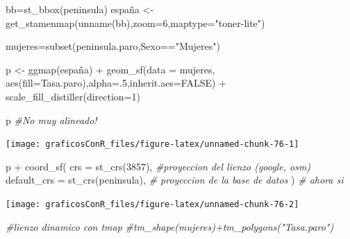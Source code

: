\documentclass[
]{article}
\newenvironment{Shaded}{\begin{snugshade}}{\end{snugshade}}
\newcommand{\AttributeTok}[1]{\textcolor[rgb]{0.77,0.63,0.00}{#1}}
\newcommand{\CommentTok}[1]{\textcolor[rgb]{0.56,0.35,0.01}{\textit{#1}}}
\newcommand{\ConstantTok}[1]{\textcolor[rgb]{0.00,0.00,0.00}{#1}}
\newcommand{\DecValTok}[1]{\textcolor[rgb]{0.00,0.00,0.81}{#1}}
\newcommand{\FunctionTok}[1]{\textcolor[rgb]{0.00,0.00,0.00}{#1}}
\newcommand{\NormalTok}[1]{#1}
\newcommand{\OtherTok}[1]{\textcolor[rgb]{0.56,0.35,0.01}{#1}}
\newcommand{\SpecialCharTok}[1]{\textcolor[rgb]{0.00,0.00,0.00}{#1}}
\newcommand{\StringTok}[1]{\textcolor[rgb]{0.31,0.60,0.02}{#1}}
\numberwithin{ejcnt}{section}
\begin{document}
\begin{Shaded}
\begin{Highlighting}[]
\NormalTok{bb}\OtherTok{=}\FunctionTok{st\_bbox}\NormalTok{(peninsula)}
\NormalTok{españa }\OtherTok{\textless{}{-}} \FunctionTok{get\_stamenmap}\NormalTok{(}\FunctionTok{unname}\NormalTok{(bb),}\AttributeTok{zoom=}\DecValTok{6}\NormalTok{,}\AttributeTok{maptype=}\StringTok{"toner{-}lite"}\NormalTok{)}

\NormalTok{mujeres}\OtherTok{=}\FunctionTok{subset}\NormalTok{(peninsula.paro,Sexo}\SpecialCharTok{==}\StringTok{"Mujeres"}\NormalTok{)}

\NormalTok{p }\OtherTok{\textless{}{-}} \FunctionTok{ggmap}\NormalTok{(españa) }\SpecialCharTok{+} 
      \FunctionTok{geom\_sf}\NormalTok{(}\AttributeTok{data =}\NormalTok{ mujeres, }\FunctionTok{aes}\NormalTok{(}\AttributeTok{fill=}\NormalTok{Tasa.paro),}\AttributeTok{alpha=}\NormalTok{.}\DecValTok{5}\NormalTok{,}\AttributeTok{inherit.aes=}\ConstantTok{FALSE}\NormalTok{) }\SpecialCharTok{+}
      \FunctionTok{scale\_fill\_distiller}\NormalTok{(}\AttributeTok{direction=}\DecValTok{1}\NormalTok{)  }

\NormalTok{p }\CommentTok{\#No muy alineado!}
\end{Highlighting}
\end{Shaded}

\begin{center}\texttt{[image: graficosConR\_files/figure-latex/unnamed-chunk-76-1]} \end{center}

\begin{Shaded}
\begin{Highlighting}[]
\NormalTok{p }\SpecialCharTok{+}   \FunctionTok{coord\_sf}\NormalTok{(}
      \AttributeTok{crs =} \FunctionTok{st\_crs}\NormalTok{(}\DecValTok{3857}\NormalTok{), }\CommentTok{\#proyeccion del lienzo (google, osm)}
    \AttributeTok{default\_crs =} \FunctionTok{st\_crs}\NormalTok{(peninsula),  }\CommentTok{\# proyeccion de la base de datos}
\NormalTok{  ) }\CommentTok{\# ahora si}
\end{Highlighting}
\end{Shaded}

\begin{center}\texttt{[image: graficosConR\_files/figure-latex/unnamed-chunk-76-2]} \end{center}

\begin{Shaded}
\begin{Highlighting}[]
\CommentTok{\#lienzo dinamico con tmap}
\CommentTok{\#tm\_shape(mujeres)+tm\_polygons("Tasa.paro")}
\end{Highlighting}
\end{Shaded}
\end{document}
